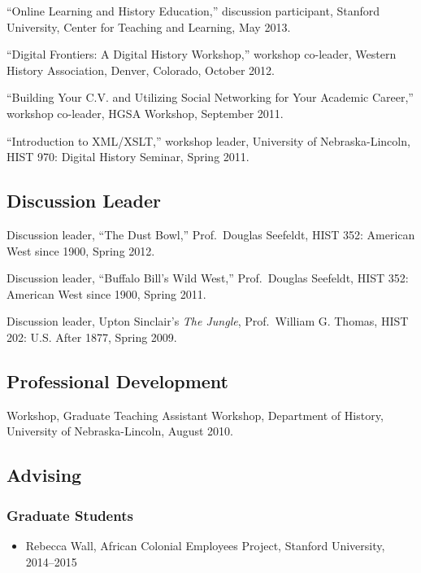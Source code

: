 ``Online Learning and History Education,'' discussion participant,
Stanford University, Center for Teaching and Learning, May 2013.

``Digital Frontiers: A Digital History Workshop,'' workshop co-leader,
Western History Association, Denver, Colorado, October 2012.

``Building Your C.V. and Utilizing Social Networking for Your Academic
Career,'' workshop co-leader, HGSA Workshop, September 2011.

``Introduction to XML/XSLT,'' workshop leader, University of
Nebraska-Lincoln, HIST 970: Digital History Seminar, Spring 2011.

\subsection{Discussion Leader}\label{discussion-leader}

Discussion leader, ``The Dust Bowl,'' Prof.~Douglas Seefeldt, HIST 352:
American West since 1900, Spring 2012.

Discussion leader, ``Buffalo Bill's Wild West,'' Prof.~Douglas Seefeldt,
HIST 352: American West since 1900, Spring 2011.

Discussion leader, Upton Sinclair's \emph{The Jungle}, Prof.~William G.
Thomas, HIST 202: U.S. After 1877, Spring 2009.

\subsection{Professional Development}\label{professional-development-1}

Workshop, Graduate Teaching Assistant Workshop, Department of History,
University of Nebraska-Lincoln, August 2010.

\subsection{Advising}\label{advising}

\subsubsection{Graduate Students}\label{graduate-students}

\begin{itemize}
\tightlist
\item
  Rebecca Wall, African Colonial Employees Project, Stanford University,
  2014--2015
\end{itemize}

